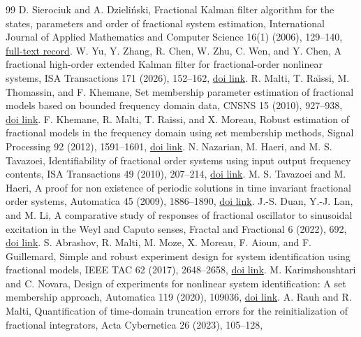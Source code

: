 \documentclass[11pt]{article}
\theoremstyle{definition}
\theoremstyle{remark}
\begin{document}
\begin{thebibliography}{99}
\small
{}
D. Sierociuk and A. Dzieli\'nski,
Fractional Kalman filter algorithm for the states, parameters and order of
fractional system estimation,
International Journal of Applied Mathematics and Computer Science 16(1)
(2006), 129--140,
\href{https://eudml.org/doc/207770}{full-text record}.
W. Yu, Y. Zhang, R. Chen, W. Zhu, C. Wen, and Y. Chen,
A fractional high-order extended Kalman filter for fractional-order nonlinear
systems, ISA Transactions 171 (2026), 152--162,
\href{https://doi.org/10.1016/j.isatra.2026.02.020}{doi link}.
R. Malti, T. Ra\"{\i}ssi, M. Thomassin, and F. Khemane,
Set membership parameter estimation of fractional models based on bounded
frequency domain data, CNSNS 15 (2010), 927--938,
\href{https://doi.org/10.1016/j.cnsns.2009.05.005}{doi link}.
F. Khemane, R. Malti, T. Raissi, and X. Moreau,
Robust estimation of fractional models in the frequency domain using set
membership methods, Signal Processing 92 (2012), 1591--1601,
\href{https://doi.org/10.1016/j.sigpro.2011.12.008}{doi link}.
N. Nazarian, M. Haeri, and M. S. Tavazoei,
Identifiability of fractional order systems using input output frequency
contents, ISA Transactions 49 (2010), 207--214,
\href{https://doi.org/10.1016/j.isatra.2009.11.007}{doi link}.
M. S. Tavazoei and M. Haeri,
A proof for non existence of periodic solutions in time invariant fractional
order systems, Automatica 45 (2009), 1886--1890,
\href{https://doi.org/10.1016/j.automatica.2009.04.001}{doi link}.
J.-S. Duan, Y.-J. Lan, and M. Li,
A comparative study of responses of fractional oscillator to sinusoidal
excitation in the Weyl and Caputo senses, Fractal and Fractional 6 (2022), 692,
\href{https://doi.org/10.3390/fractalfract6120692}{doi link}.
S. Abrashov, R. Malti, M. Moze, X. Moreau, F. Aioun, and F. Guillemard,
Simple and robust experiment design for system identification using
fractional models, IEEE TAC 62 (2017), 2648--2658,
\href{https://doi.org/10.1109/TAC.2016.2614910}{doi link}.
M. Karimshoushtari and C. Novara,
Design of experiments for nonlinear system identification: A set membership
approach, Automatica 119 (2020), 109036,
\href{https://doi.org/10.1016/j.automatica.2020.109036}{doi link}.
A. Rauh and R. Malti,
Quantification of time-domain truncation errors for the reinitialization of
fractional integrators, Acta Cybernetica 26 (2023), 105--128,

\end{thebibliography}
\end{document}
